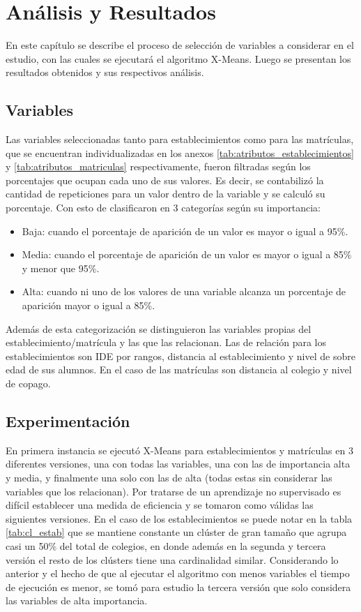 \chapter{Análisis y Resultados}

En este capítulo se describe el proceso de selección de variables a considerar en el estudio,  con las cuales se ejecutará el algoritmo X-Means. Luego se presentan los resultados obtenidos y sus respectivos análisis.

\section{Variables}
Las variables seleccionadas tanto para establecimientos como para las matrículas, que se encuentran individualizadas en los anexos \ref{tab:atributos_establecimientos} y \ref{tab:atributos_matriculas} respectivamente, fueron filtradas según los porcentajes que ocupan cada uno de sus valores. Es decir, se contabilizó la cantidad de repeticiones para un valor dentro de la variable y se calculó su porcentaje. Con esto de clasificaron en 3 categorías según su importancia:


\begin{itemize}
    \item Baja: cuando el porcentaje de aparición de un valor es mayor o igual a 95\%. 
    \item Media: cuando el porcentaje de aparición de un valor es mayor o igual a 85\% y menor que 95\%.
    \item Alta: cuando ni uno de los valores de una variable alcanza un porcentaje de aparición mayor o igual a 85\%.
\end{itemize}

Además de esta categorización se distinguieron las variables propias del establecimiento/matrícula y las que las relacionan. Las de relación para los establecimientos son IDE por rangos, distancia al establecimiento y nivel de sobre edad de sus alumnos. En el caso de las matrículas son distancia al colegio y nivel de copago.

\section{Experimentación}

En primera instancia se ejecutó X-Means para establecimientos y matrículas en 3 diferentes versiones, una con todas las variables, una con las de importancia alta y media, y finalmente una solo con las de alta (todas estas sin considerar las variables que los relacionan). Por tratarse de un aprendizaje no supervisado es difícil establecer una medida de eficiencia  y se tomaron como válidas las siguientes versiones. En el caso de los establecimientos se puede notar en la tabla \ref{tab:cl_estab} que se mantiene constante un clúster de gran tamaño que agrupa casi un 50\% del total de colegios, en donde además en la segunda y tercera versión el resto de los clústers tiene una cardinalidad similar. Considerando lo anterior y el hecho de que al ejecutar el algoritmo con menos variables el tiempo de ejecución es menor, se tomó para estudio la tercera versión que solo considera las variables de alta importancia.

